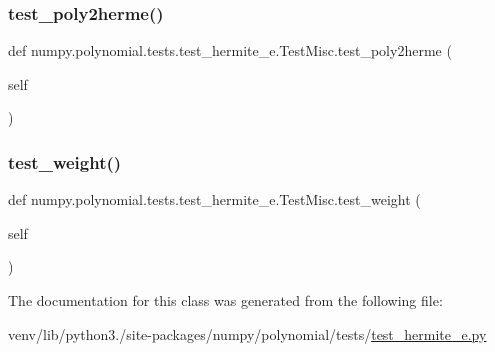 \subsubsection{\texorpdfstring{test\+\_\+poly2herme()}{test\_poly2herme()}}
{\footnotesize\ttfamily def numpy.\+polynomial.\+tests.\+test\+\_\+hermite\+\_\+e.\+Test\+Misc.\+test\+\_\+poly2herme (\begin{DoxyParamCaption}\item[{}]{self }\end{DoxyParamCaption})}

\mbox{\label{classnumpy_1_1polynomial_1_1tests_1_1test__hermite__e_1_1TestMisc_afd331c1e0257d27ec180733136a8ff5c}} 
\subsubsection{\texorpdfstring{test\+\_\+weight()}{test\_weight()}}
{\footnotesize\ttfamily def numpy.\+polynomial.\+tests.\+test\+\_\+hermite\+\_\+e.\+Test\+Misc.\+test\+\_\+weight (\begin{DoxyParamCaption}\item[{}]{self }\end{DoxyParamCaption})}



The documentation for this class was generated from the following file\+:\begin{DoxyCompactItemize}
\item 
venv/lib/python3./site-\/packages/numpy/polynomial/tests/\hyperlink{test__hermite__e_8py}{test\+\_\+hermite\+\_\+e.\+py}\end{DoxyCompactItemize}

